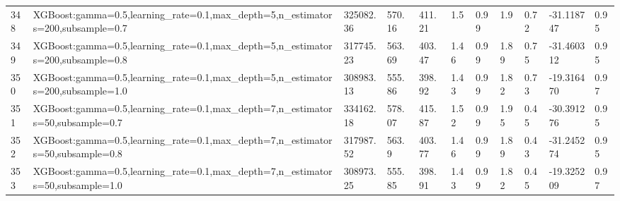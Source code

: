 \begin{longtable}{C{0.8cm} L{2cm} C{1.15cm} C{1.15cm} C{1.15cm} C{1.15cm} C{0.85cm} C{1.25cm} C{1.2cm} C{1.5cm} C{1.0cm}}
348 & XGBoost:\newline gamma=0.5,\newline learning\_rate=0.1,\newline max\_depth=5,\newline n\_estimators=200,\newline subsample=0.7 & 325082.36 & 570.16 & 411.21 & 1.5 & 0.99 & 1.9 & 0.72 & -31.118747 & 0.95 \\
349 & XGBoost:\newline gamma=0.5,\newline learning\_rate=0.1,\newline max\_depth=5,\newline n\_estimators=200,\newline subsample=0.8 & 317745.23 & 563.69 & 403.47 & 1.46 & 0.99 & 1.89 & 0.75 & -31.460312 & 0.95 \\
350 & XGBoost:\newline gamma=0.5,\newline learning\_rate=0.1,\newline max\_depth=5,\newline n\_estimators=200,\newline subsample=1.0 & 308983.13 & 555.86 & 398.92 & 1.43 & 0.99 & 1.82 & 0.73 & -19.316470 & 0.97 \\
351 & XGBoost:\newline gamma=0.5,\newline learning\_rate=0.1,\newline max\_depth=7,\newline n\_estimators=50,\newline subsample=0.7 & 334162.18 & 578.07 & 415.87 & 1.52 & 0.99 & 1.95 & 0.45 & -30.391276 & 0.95 \\
352 & XGBoost:\newline gamma=0.5,\newline learning\_rate=0.1,\newline max\_depth=7,\newline n\_estimators=50,\newline subsample=0.8 & 317987.52 & 563.9 & 403.77 & 1.46 & 0.99 & 1.89 & 0.43 & -31.245274 & 0.95 \\
353 & XGBoost:\newline gamma=0.5,\newline learning\_rate=0.1,\newline max\_depth=7,\newline n\_estimators=50,\newline subsample=1.0 & 308973.25 & 555.85 & 398.91 & 1.43 & 0.99 & 1.82 & 0.45 & -19.325209 & 0.97 \\

\end{longtable}
